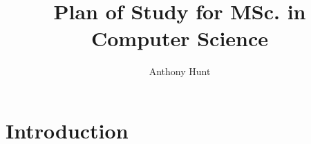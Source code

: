 \documentclass{article}
\title{Plan of Study for MSc. in Computer Science}
\author{Anthony Hunt}
\begin{document}
\maketitle
\tableofcontents
\newpage

\section{Introduction}
\end{document}
